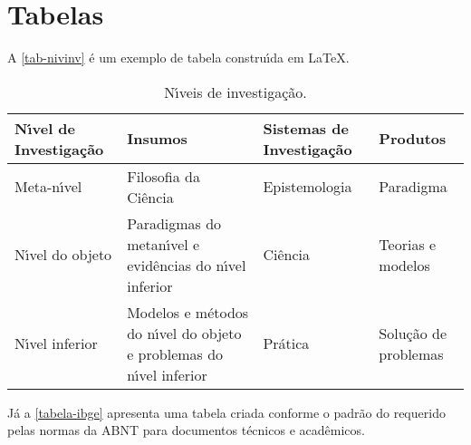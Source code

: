 \section{Tabelas}

A \autoref{tab-nivinv} \'{e} um exemplo de tabela constru\'{\i}da em
\LaTeX.

\begin{table}[htb]
\ABNTEXfontereduzida
\caption[N\'{\i}veis de investiga\c{c}\~{a}o]{N\'{\i}veis de investiga\c{c}\~{a}o.}
\label{tab-nivinv}
\begin{tabular}{p{2.6cm}|p{6.0cm}|p{2.25cm}|p{3.40cm}}
   \textbf{N\'{\i}vel de Investiga\c{c}\~{a}o} & \textbf{Insumos}  & \textbf{Sistemas de Investiga\c{c}\~{a}o}  & \textbf{Produtos}  \\
    \hline
    Meta-n\'{\i}vel & Filosofia\index{filosofia} da Ci\^{e}ncia  & Epistemologia &
    Paradigma  \\
    \hline
    N\'{\i}vel do objeto & Paradigmas do metan\'{\i}vel e evid\^{e}ncias do n\'{\i}vel inferior &
    Ci\^{e}ncia  & Teorias e modelos \\
    \hline
    N\'{\i}vel inferior & Modelos e m\'{e}todos do n\'{\i}vel do objeto e problemas do n\'{\i}vel inferior & Pr\'{a}tica & Solu\c{c}\~{a}o de problemas  \\
\end{tabular}
\end{table}

J\'{a} a \autoref{tabela-ibge} apresenta uma tabela criada conforme o padr\~{a}o do
 requerido pelas normas da ABNT para documentos t\'{e}cnicos e
acad\^{e}micos.

\begin{table}[htb]
\end{table}


